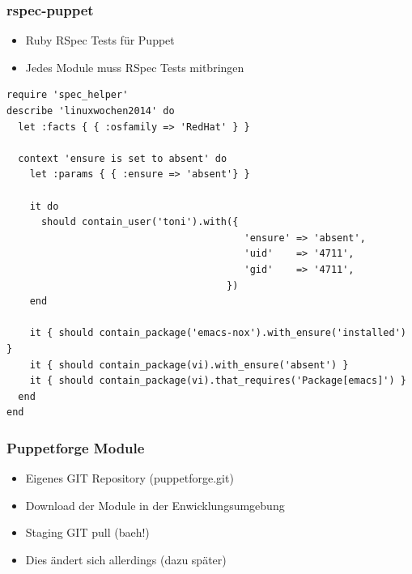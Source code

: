 \documentclass{beamer}
\begin{document}
\begin{frame}[fragile]
  \frametitle{rspec-puppet}

  \begin{itemize}
  \item Ruby RSpec Tests für Puppet
  \item Jedes Module muss RSpec Tests mitbringen
  \end{itemize}

  \begin{lstlisting}
require 'spec_helper'
describe 'linuxwochen2014' do
  let :facts { { :osfamily => 'RedHat' } }

  context 'ensure is set to absent' do
    let :params { { :ensure => 'absent'} }

    it do
      should contain_user('toni').with({
                                         'ensure' => 'absent',
                                         'uid'    => '4711',
                                         'gid'    => '4711',
                                      })
    end

    it { should contain_package('emacs-nox').with_ensure('installed') }
    it { should contain_package(vi).with_ensure('absent') }
    it { should contain_package(vi).that_requires('Package[emacs]') }
  end
end
  \end{lstlisting}

\end{frame}

\begin{frame}
\end{frame}

\begin{frame}
\end{frame}

\begin{frame}
  \frametitle{Puppetforge Module}

  \begin{itemize}
  \item Eigenes GIT Repository (puppetforge.git)
  \item Download der Module in der Enwicklungsumgebung
  \item Staging GIT pull (baeh!)
  \item Dies ändert sich allerdings (dazu später)
  \end{itemize}
\end{frame}
\end{document}

